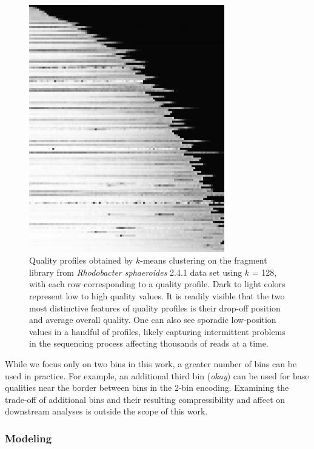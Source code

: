 \documentclass{bioinfo}
\begin{document}
\begin{methods}
\begin{figure}[!tpb]
\centerline{\includegraphics[width=3.35in]{profiles_128.png}}
\caption{Quality profiles obtained by $k$-means clustering on the
  fragment library from \textit{Rhodobacter sphaeroides} 2.4.1 data
  set using $k$ = 128, with each row corresponding to a quality
  profile. Dark to light colors represent low to high quality
  values. It is readily visible that the two most distinctive features
  of quality profiles is their drop-off position and average overall
  quality. One can also see sporadic low-position values in a handful
  of profiles, likely capturing intermittent problems in the
  sequencing process affecting thousands of reads at a
  time.}\label{fig:profiles_128}
\end{figure}

While we focus only on two bins in this work, a greater number of bins can be used in practice. For example, an additional third bin (\emph{okay}) can be used for base qualities near the border between bins in the 2-bin encoding. Examining the trade-off of additional bins and their resulting compressibility and affect on downstream analyses is outside the scope of this work.

\subsubsection{Modeling}


\end{methods}
\end{document}

